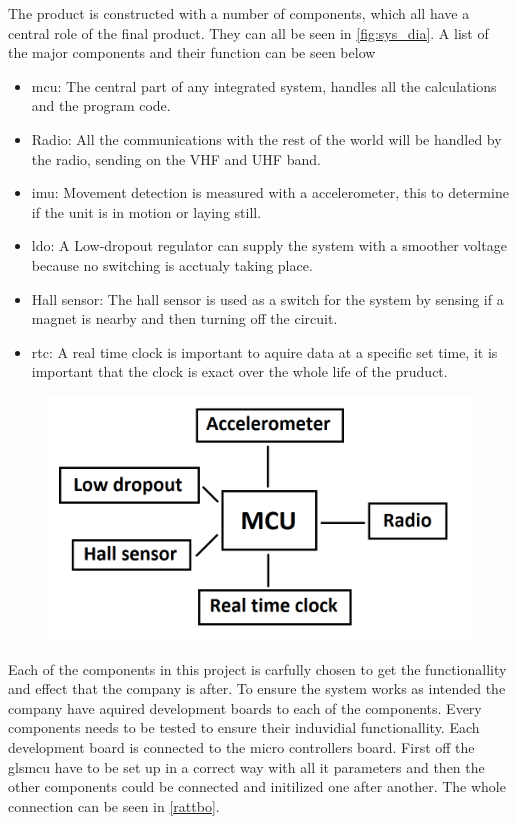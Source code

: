 
The product is constructed with a number of components, which all have a central role of the final product. They can all be seen in \autoref{fig:sys_dia}. A list of the major components and their function can be seen below  

\begin{itemize}[noitemsep] 
\item \gls{mcu}: The central part of any integrated system, handles all the calculations and the program code.
\item Radio: All the communications with the rest of the world will be handled by the radio, sending on the VHF and UHF band.
\item \gls{imu}: Movement detection is measured with a accelerometer, this to determine if the unit is  in motion or laying still. 
\item \gls{ldo}: A Low-dropout regulator can supply the system with a smoother voltage because no switching is acctualy taking place.
\item Hall sensor: The hall sensor is used as a switch for the system by sensing if a magnet is nearby and then turning off the circuit.
\item \gls{rtc}: A real time clock is important to aquire data at a specific set time, it is important that the clock is exact over the whole life of the pruduct.
\end{itemize} 


\begin{figure}[H] 
\centering 
\includegraphics[width=.8\linewidth]{Figures/System_diagram} 
\label{fig:sys_dia} 
\end{figure} 

Each of the components in this project is carfully chosen to get the functionallity and effect that the company is after. To ensure the system works as intended the company have aquired development boards to each of the components. Every components needs to be tested to ensure their induvidial functionallity. Each development board is connected to the micro controllers board. First off the gls{mcu} have to be set up in a correct way with all it parameters and then the other components could be connected and initilized one after another. The whole connection can be seen in \autoref{rattbo}.

